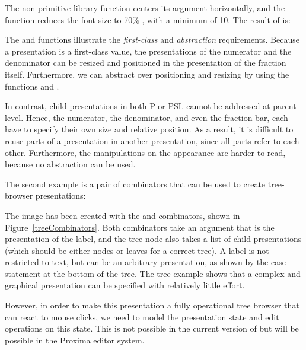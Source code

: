 The non-primitive library function  centers its argument horizontally, and the  function reduces the font size to 70\%
, with a minimum of 10. The result of  is:

\begin{center}
\end{center}

The  and  functions illustrate the {\em first-class} and {\em abstraction} requirements. Because a presentation is a first-class value, the presentations of the numerator and the denominator can be resized and positioned in the presentation of the fraction itself. Furthermore, we can abstract over positioning and resizing by using the functions  and . 

In contrast, child presentations in both P or PSL cannot be addressed at parent level. Hence, the numerator, the denominator, and even the fraction bar, each have to specify their own size and relative position. As a result, it is difficult to reuse parts of a presentation in another presentation, since all parts refer to each other. Furthermore,  the manipulations on the appearance are harder to read, because no abstraction can be used. 


The second example is a pair of combinators that can be used to create tree-browser presentations:

\begin{center}
\end{center}


The image has been created with the  and  combinators, shown in Figure~\ref{treeCombinators}. Both combinators take an  argument that is the presentation of the label, and the tree node also takes a list of child presentations (which should be either nodes or leaves for a correct tree). A label is not restricted to text, but can be an arbitrary {\Xprez} presentation, as shown by the case statement at the bottom of the tree. The tree example shows that a complex and graphical presentation can be specified with relatively little effort.

\bc However, in order to make this presentation a fully operational tree browser that can react to mouse clicks, we need to model the presentation state and edit operations on this state. This is not possible in the current version of {\Xprez} but will be possible in the Proxima editor system.
\ec

